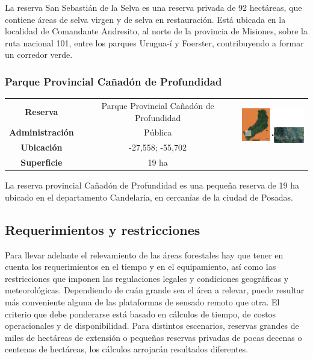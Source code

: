 La reserva San Sebastián de la Selva \cite{noauthor_red_nodate} es una reserva privada de 92 hectáreas, que contiene áreas de selva virgen y de selva en restauración. Está ubicada en la localidad de Comandante Andresito, al norte de la provincia de Misiones, sobre la ruta nacional 101, entre los parques Urugua-í y Foerster, contribuyendo a formar un corredor verde.
\subsubsection{Parque Provincial Cañadón de Profundidad}
\begin{table}[H]
\centering
\begin{tabular}{|c|c|c|}
\hline
 \textbf{Reserva} & Parque Provincial Cañadón de Profundidad &   \multirow{ 3}{*}{\includegraphics[width=30mm]{Imagenes/Profundidad.png}}\\ 
\textbf{Administración} & Pública\\
        
        \textbf{Ubicación} & -27,558; -55,702 \\
         
        \textbf{Superficie} & 19 ha\\
\hline        
\end{tabular}

\label{Profundidad}
\end{table}

La reserva provincial Cañadón de Profundidad \cite{noauthor_sib_nodate} es una pequeña reserva de 19 ha ubicado en el departamento Candelaria, en cercanías de la ciudad de Posadas.

\subsection{Requerimientos y restricciones} \label{Metodo calculo relevamiento}
Para llevar adelante el relevamiento de las áreas forestales hay que tener en cuenta los requerimientos en el tiempo y en el equipamiento, así como las restricciones que imponen las regulaciones legales y condiciones geográficas y meteorológicas. Dependiendo de cuán grande sea el área a relevar, puede resultar más conveniente alguna de las plataformas de sensado remoto que otra. El criterio que debe ponderarse está basado en cálculos de tiempo, de costos operacionales y de disponibilidad. Para distintos escenarios, reservas grandes de miles de hectáreas de extensión o pequeñas reservas privadas de pocas decenas o centenas de hectáreas, los cálculos arrojarán resultados diferentes.
